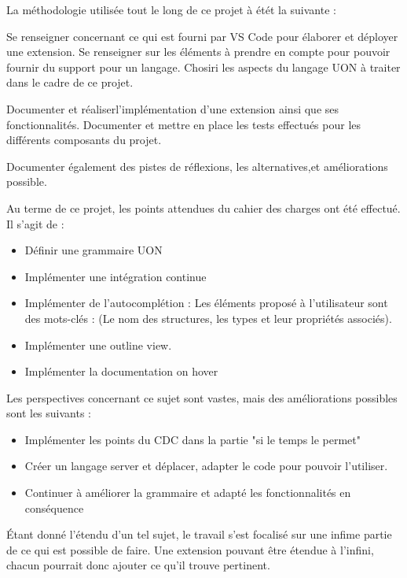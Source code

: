 La méthodologie utilisée tout le long de ce projet à étét la suivante :

Se renseigner concernant ce qui est fourni par VS Code pour élaborer et déployer une extension.
Se renseigner sur les éléments à prendre en compte pour pouvoir fournir du support pour un langage.
Chosiri les aspects du langage UON à traiter dans le cadre de ce projet.

Documenter et réaliserl'implémentation d'une extension ainsi que ses fonctionnalités.
Documenter et mettre en place les tests effectués pour les différents composants du projet.

Documenter également des pistes de réflexions, les alternatives,et améliorations possible.

Au terme de ce projet, les points attendues du cahier des charges ont été effectué. Il s'agit de :
\begin{itemize}
    \item Définir une grammaire UON
    \item Implémenter une intégration continue
    \item Implémenter de l'autocomplétion : Les éléments proposé à l'utilisateur sont des mots-clés : (Le nom des structures, les types et leur propriétés associés).
    \item Implémenter une outline view.
    \item Implémenter la documentation on hover
\end{itemize}

Les perspectives concernant ce sujet sont vastes, mais des améliorations possibles sont les suivants :
\begin{itemize}
    \item Implémenter les points du CDC dans la partie "si le temps le permet"
    \item Créer un langage server et déplacer, adapter le code pour pouvoir l'utiliser.
    \item Continuer à améliorer la grammaire et adapté les fonctionnalités en conséquence
\end{itemize}

Étant donné l'étendu d'un tel sujet, le travail s'est focalisé sur une infime partie de ce qui est possible de faire.
Une extension pouvant être étendue à l'infini, chacun pourrait donc ajouter ce qu'il trouve pertinent.

